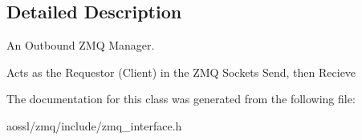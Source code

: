 \subsection{Detailed Description}
An Outbound Z\+MQ Manager. 

Acts as the Requestor (Client) in the Z\+MQ Sockets Send, then Recieve 

The documentation for this class was generated from the following file\+:\begin{DoxyCompactItemize}
\item 
aossl/zmq/include/zmq\+\_\+interface.\+h\end{DoxyCompactItemize}
